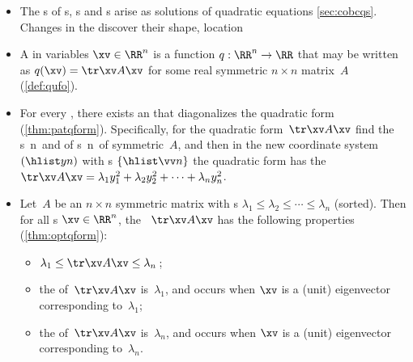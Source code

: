 \begin{itemize}
\itemhi For every real ~\(A\), 
matrix~\(A\) is symmetric iff it is  (\cref{thm:symspec}).

\item The s of s, s and s arise as solutions of quadratic equations \cref{sec:cobcqs}.
Changes in the  discover their shape, location 

\item A  in variables \(\xv\in\RR^n\) is a function \(q:\RR^n\to\RR\) that may be written as \(q(\xv)=\tr\xv A\xv\) for some real symmetric \(n\times n\) matrix~\(A\) (\cref{def:qufo}).

\item For every , there exists an   that diagonalizes the quadratic form (\cref{thm:patqform}).
Specifically, for the quadratic form~\(\tr\xv A\xv\) find the 
s~\hlist\lambda n\ and  of s~\hlist\vv n\ of symmetric~\(A\), and then in the new coordinate system~\((\hlist yn)\) with s \(\{\hlist\vv n\}\) the quadratic form has the  \(\tr\xv A\xv=\lambda_1y_1^2+\lambda_2y_2^2+\cdots+\lambda_ny_n^2\).

\item Let~\(A\) be an \(n\times n\) symmetric matrix with s \(\lambda_1\leq\lambda_2\leq\cdots\leq\lambda_n\) (sorted). 
Then for all s \(\xv\in\RR^n\), the ~\(\tr\xv A\xv\) has the following properties (\cref{thm:optqform}):
\begin{itemize}
\item \(\lambda_1\leq \tr\xv A\xv\leq\lambda_n\)\,;
\item the  of~\(\tr\xv A\xv\) is~\(\lambda_1\), and occurs when \(\xv\) is a (unit) eigenvector corresponding to~\(\lambda_1\);
\item the  of~\(\tr\xv A\xv\) is~\(\lambda_n\), and occurs when \(\xv\) is a (unit) eigenvector corresponding to~\(\lambda_n\).
\end{itemize}


\end{itemize}





\makeanswers
